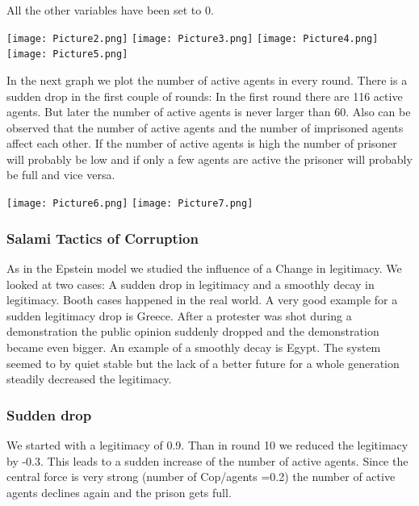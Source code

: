 \documentclass[11pt]{article}
\begin{document}
All the other variables have been set to 0.\newline

\texttt{[image: Picture2.png]}\newline
\texttt{[image: Picture3.png]}\newline
\texttt{[image: Picture4.png]}\newline
\texttt{[image: Picture5.png]}\newline

In the next graph we plot the number of active agents in every round. There is a sudden drop in the first couple of rounds: In the first round there are 116 active agents. But later the number of active agents is never larger than 60. Also can be observed that the number of active agents and the number of imprisoned agents affect each other. If the number of active agents is high the number of prisoner will probably be low and if only a few agents are active the prisoner will probably be full and vice versa.\newline

\texttt{[image: Picture6.png]}\newline
\texttt{[image: Picture7.png]}

\subsubsection{Salami Tactics of Corruption}
As in the Epstein model we studied the influence of a Change in legitimacy. We looked at two cases: A sudden drop in legitimacy and a smoothly decay in legitimacy. Booth cases happened in the real world. A very good example for a sudden legitimacy drop is Greece. After a protester was shot during a demonstration the public opinion suddenly dropped and the demonstration became even bigger.  An example of a smoothly decay is Egypt. The system seemed to by quiet stable but the lack of a better future for a whole generation steadily decreased the legitimacy.\newline

\subsubsection{Sudden drop}
We started with a legitimacy of 0.9.  Than in round 10 we reduced the legitimacy by -0.3.  This leads to a sudden increase of the number of active agents. Since the central force is very strong (number of Cop/agents =0.2) the number of active agents declines again and the prison gets full.\newline
\end{document}
